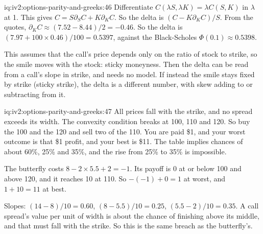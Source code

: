 \begin{solution}{iq:iv2:options-parity-and-greeks:46}
Differentiate $C(\lambda S, \lambda K) = \lambda C(S, K)$ in $\lambda$ at 1. This gives $C = S\partial_S C + K\partial_K C$. So the delta is $(C - K\partial_K C)/S$. From the quotes, $\partial_K C \approx (7.52 - 8.44)/2 = -0.46$. So the delta is $(7.97 + 100 \times 0.46)/100 = 0.5397$, against the Black-Scholes $\Phi(0.1) \approx 0.5398$.

This assumes that the call's price depends only on the ratio of stock to strike, so the smile moves with the stock: sticky moneyness. Then the delta can be read from a call's slope in strike, and needs no model. If instead the smile stays fixed by strike (sticky strike), the delta is a different number, with skew adding to or subtracting from it.

\end{solution}

\begin{solution}{iq:iv2:options-parity-and-greeks:47}
All prices fall with the strike, and no spread exceeds its width. The convexity condition breaks at 100, 110 and 120. So buy the 100 and the 120 and sell two of the 110. You are paid \$1, and your worst outcome is that \$1 profit, and your best is \$11. The table implies chances of about 60\%, 25\% and 35\%, and the rise from 25\% to 35\% is impossible.

The butterfly costs $8 - 2 \times 5.5 + 2 = -1$. Its payoff is 0 at or below 100 and above 120, and it reaches 10 at 110. So $-(-1) + 0 = 1$ at worst, and $1 + 10 = 11$ at best.

Slopes: $(14 - 8)/10 = 0.60$, $(8 - 5.5)/10 = 0.25$, $(5.5 - 2)/10 = 0.35$. A call spread's value per unit of width is about the chance of finishing above its middle, and that must fall with the strike. So this is the same breach as the butterfly's.

\end{solution}

